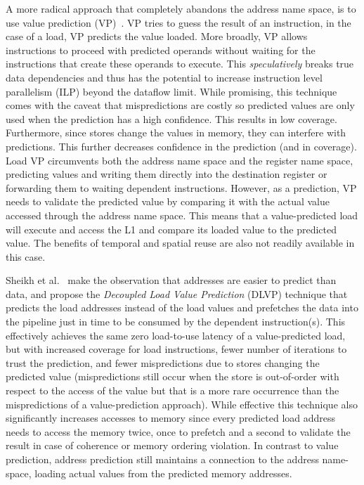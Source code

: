 \documentclass{sig-alternate}
\begin{document}
A more radical approach that completely abandons the address name space, is to use value prediction (VP)~\cite{VP/lipasti96exceeding, VP/lipasti96value, VP/wang97highly, VP/tuck05multithreaded, VP/perais14eole, VP/perais15bebop}. VP tries to guess the result of an instruction, in the case of a load, VP predicts the value loaded. More broadly, VP allows instructions to proceed with predicted operands without waiting for the instructions that create these operands to execute. This \emph{speculatively} breaks true data dependencies and thus has the potential to increase instruction level parallelism (ILP) beyond the dataflow limit.
While promising, this technique comes with the caveat that mispredictions are costly so predicted values are only used when the prediction has a high confidence. This results in low coverage. Furthermore, since stores change the values in memory, they can interfere with predictions. This further decreases confidence in the prediction (and in coverage).
Load VP circumvents both the address name space and the register name space, predicting values and writing them directly into the destination register or forwarding them to waiting dependent instructions. However, as a prediction, VP needs to validate the predicted value by comparing it with the actual value accessed through the address name space. This means that a value-predicted load will execute and access the L1 and compare its loaded value to the predicted value. The benefits of temporal and spatial reuse are also not readily available in this case.
 
Sheikh et al.~\cite{DLVP/sheikh17} make the observation that addresses are easier to predict than data, and propose the \textit{Decoupled Load Value Prediction} (DLVP) technique that predicts the load addresses instead of the load values and prefetches the data into the pipeline just in time to be consumed by the dependent instruction(s). This effectively achieves the same zero load-to-use latency of a value-predicted load, but with increased coverage for load instructions, fewer number of iterations to trust the prediction, and fewer mispredictions due to stores changing the predicted value (mispredictions still occur when the store is out-of-order with respect to the access of the value but that is a more rare occurrence than the mispredictions of a value-prediction approach).
While effective this technique also significantly increases accesses to memory since every predicted load address needs to access the memory twice, once to prefetch and a second to validate the result in case of coherence or memory ordering violation. 
In contrast to value prediction, address prediction still maintains a connection to the address name-space, loading actual values from the predicted memory addresses.
\end{document}
